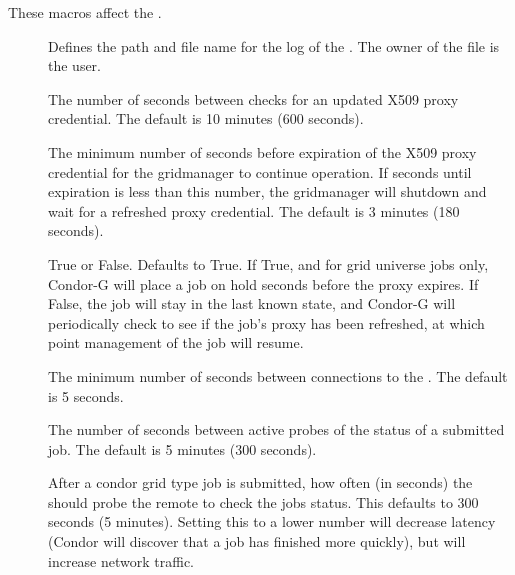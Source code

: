 These macros affect the .
\begin{description}

\item[]
\label{param:GridmanagerLog} Defines the path and file name
  for the log of the . 
  The owner of the file is the  user.

\item[]
\label{param:GridmanagerCheckproxyInterval} The number of seconds
between checks for an updated X509 proxy credential. The default
is 10 minutes (600 seconds).

\item[]
\label{param:GridmanagerMinimumProxyTime} The minimum number of
seconds before expiration of the X509 proxy credential for the
gridmanager to continue operation. If seconds until expiration is
less than this number, the gridmanager will shutdown and wait for
a refreshed proxy credential. The default is 3 minutes (180 seconds).

\item[]
\label{param:HoldJobIfCredentialExpires} True or False.
Defaults to True.
If True, and for grid universe jobs only,
Condor-G will place a job on hold
 seconds
before the proxy expires.
If False,
the job will stay in the last known state,
and Condor-G will periodically check to see if the job's proxy has been
refreshed, at which point management of the job will resume.

\item[]
\label{param:GridmanagerContactScheddDelay} The minimum number of
seconds between connections to the . The default is 5 seconds.

\item[]
\label{param:GridmanagerJobProbeInterval}
The number of seconds between
active probes of the status of a submitted job. The default is 5
minutes (300 seconds).

\item[]
\label{param:CondorJobPollInterval}
After a condor grid type job is submitted, how often (in seconds) the 
should probe the remote  to check the jobs status.  
This defaults to 300 seconds (5 minutes).
Setting this to a lower number will decrease latency (Condor will discover
that a job has finished more quickly), but will increase network traffic.



\end{description}

